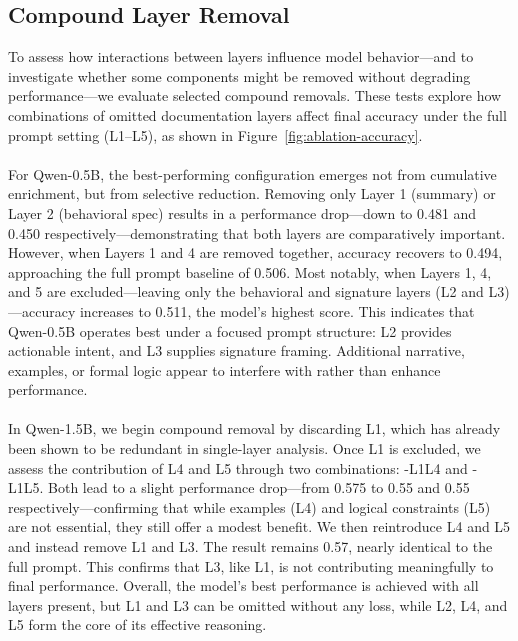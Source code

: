 \documentclass[a4paper]{usiinfbachelorproject}
\begin{document}
\subsection{Compound Layer Removal}

To assess how interactions between layers influence model behavior—and to investigate whether some components might be removed without degrading performance—we evaluate selected compound removals. These tests explore how combinations of omitted documentation layers affect final accuracy under the full prompt setting (L1–L5), as shown in Figure~\ref{fig:ablation-accuracy}. \\
\\
For Qwen-0.5B, the best-performing configuration emerges not from cumulative enrichment, but from selective reduction. Removing only Layer 1 (summary) or Layer 2 (behavioral spec) results in a performance drop—down to 0.481 and 0.450 respectively—demonstrating that both layers are comparatively important. However, when Layers 1 and 4 are removed together, accuracy recovers to 0.494, approaching the full prompt baseline of 0.506. Most notably, when Layers 1, 4, and 5 are excluded—leaving only the behavioral and signature layers (L2 and L3)—accuracy increases to 0.511, the model’s highest score. This indicates that Qwen-0.5B operates best under a focused prompt structure: L2 provides actionable intent, and L3 supplies signature framing. Additional narrative, examples, or formal logic appear to interfere with rather than enhance performance. \\
\\
In Qwen-1.5B, we begin compound removal by discarding L1, which has already been shown to be redundant in single-layer analysis. Once L1 is excluded, we assess the contribution of L4 and L5 through two combinations: -L1L4 and -L1L5. Both lead to a slight performance drop—from 0.575 to 0.55 and 0.55 respectively—confirming that while examples (L4) and logical constraints (L5) are not essential, they still offer a modest benefit. We then reintroduce L4 and L5 and instead remove L1 and L3. The result remains 0.57, nearly identical to the full prompt. This confirms that L3, like L1, is not contributing meaningfully to final performance. Overall, the model's best performance is achieved with all layers present, but L1 and L3 can be omitted without any loss, while L2, L4, and L5 form the core of its effective reasoning. \\
\\
\end{document}
